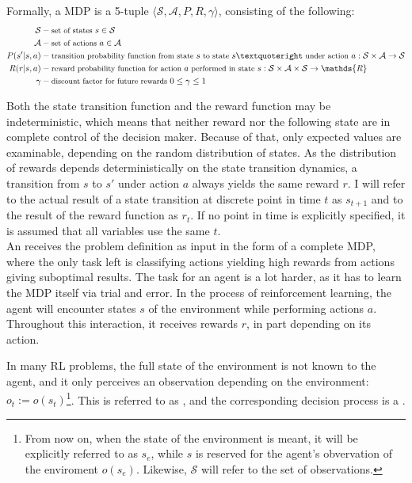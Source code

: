 Formally, a MDP is a 5-tuple $\langle \mathcal{S}, \mathcal{A}, P, R, \gamma \rangle$, consisting of the following:\\
\begin{align*}
\mathcal{S} &- \text{\small set of states } s\in \mathcal{S}\\
\mathcal{A} &- \text{\small set of actions } a \in \mathcal{A}\\
P(s'|s, a) &- \text{\small transition probability function from state } s \text{\small ~to state } s’ \text{\small ~under action } a: \mathcal{S} \times \mathcal{A} \rightarrow \mathcal{S} \\
R(r|s, a) &- \text{\small reward probability function for action } a \text{\small ~performed in state } s: \mathcal{S} \times \mathcal{A} \times \mathcal{S} \rightarrow \mathds{R} \\
\gamma &- \text{\small discount factor for future rewards } 0 \leq \gamma \leq 1
\end{align*}

Both the state transition function and the reward function may be indeterministic, which means that neither reward nor the following state are in complete control of the decision maker. Because of that, only expected values are examinable, depending on the random distribution of states. As the distribution of rewards depends deterministically on the state transition dynamics, a transition from $s$ to $s'$ under action $a$ always yields the same reward $r$. I will refer to the actual result of a state transition at discrete point in time $t$ as $s_{t+1}$ and to the result of the reward function as $r_t$. If no point in time is explicitly specified, it is assumed that all variables use the same $t$.\\

\noindent An  receives the problem definition as input in the form of a complete MDP, where the only task left is classifying actions yielding high rewards from actions giving suboptimal results. The task for an  agent is a lot harder, as it has to learn the MDP itself via trial and error. In the process of reinforcement learning, the agent will encounter states $s$ of the environment while performing actions $a$. Throughout this interaction, it receives rewards $r$, in part depending on its action.

In many RL problems, the full state of the environment is not known to the agent, and it only perceives an observation depending on the environment: $o_t := o(s_t)$\footnote{From now on, when the state of the environment is meant, it will be explicitly referred to as $s_e$, while $s$ is reserved for the agent's obvervation of the enviroment $o(s_e)$. Likewise, $\mathcal{S}$ will refer to the set of observations.}. This is referred to as , and the corresponding decision process is a . 

